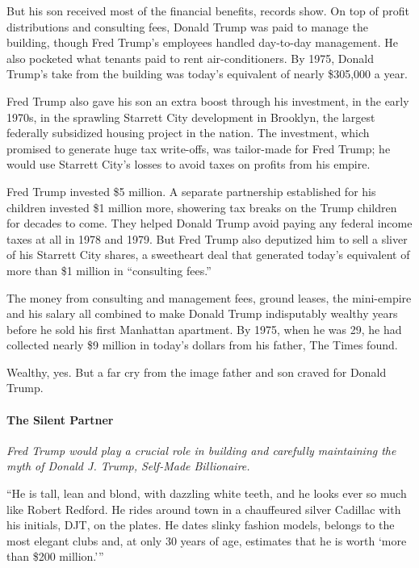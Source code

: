 But his son received most of the financial benefits, records show. On
top of profit distributions and consulting fees, Donald Trump was paid
to manage the building, though Fred Trump's employees handled day-to-day
management. He also pocketed what tenants paid to rent air-conditioners.
By 1975, Donald Trump's take from the building was today's equivalent of
nearly \$305,000 a year.

Fred Trump also gave his son an extra boost through his investment, in
the early 1970s, in the sprawling Starrett City development in Brooklyn,
the largest federally subsidized housing project in the nation. The
investment, which promised to generate huge tax write-offs, was
tailor-made for Fred Trump; he would use Starrett City's losses to avoid
taxes on profits from his empire.

Fred Trump invested \$5 million. A separate partnership established for
his children invested \$1 million more, showering tax breaks on the
Trump children for decades to come. They helped Donald Trump avoid
paying any federal income taxes at all in 1978 and 1979. But Fred Trump
also deputized him to sell a sliver of his Starrett City shares, a
sweetheart deal that generated today's equivalent of more than \$1
million in ``consulting fees.''

The money from consulting and management fees, ground leases, the
mini-empire and his salary all combined to make Donald Trump
indisputably wealthy years before he sold his first Manhattan apartment.
By 1975, when he was 29, he had collected nearly \$9 million in today's
dollars from his father, The Times found.

Wealthy, yes. But a far cry from the image father and son craved for
Donald Trump.

\hypertarget{the-silent-partner}{%
\paragraph{The Silent Partner}\label{the-silent-partner}}

\emph{Fred Trump would play a crucial role in building and carefully
maintaining the myth of Donald J. Trump, Self-Made Billionaire.}

``He is tall, lean and blond, with dazzling white teeth, and he looks
ever so much like Robert Redford. He rides around town in a chauffeured
silver Cadillac with his initials, DJT, on the plates. He dates slinky
fashion models, belongs to the most elegant clubs and, at only 30 years
of age, estimates that he is worth `more than \$200 million.'''

